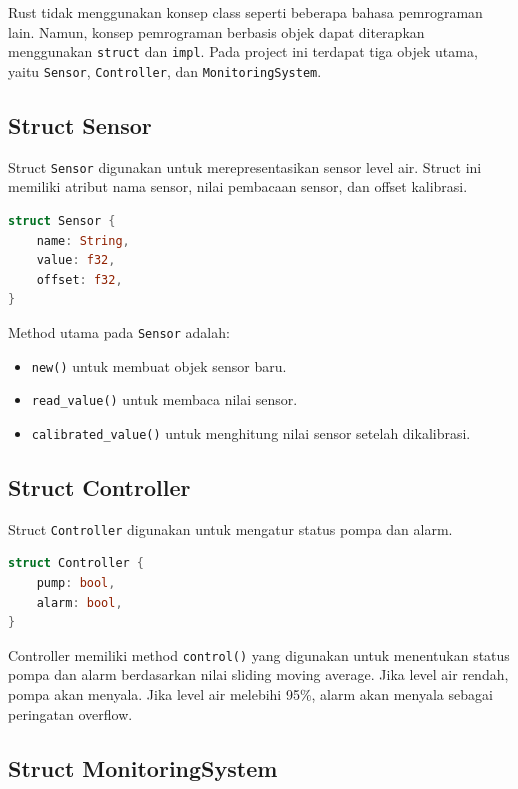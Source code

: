 \documentclass[12pt,a4paper]{article}
\begin{document}
Rust tidak menggunakan konsep class seperti beberapa bahasa pemrograman lain. Namun, konsep pemrograman berbasis objek dapat diterapkan menggunakan \texttt{struct} dan \texttt{impl}. Pada project ini terdapat tiga objek utama, yaitu \texttt{Sensor}, \texttt{Controller}, dan \texttt{MonitoringSystem}.

\subsection{Struct Sensor}

Struct \texttt{Sensor} digunakan untuk merepresentasikan sensor level air. Struct ini memiliki atribut nama sensor, nilai pembacaan sensor, dan offset kalibrasi.

\begin{lstlisting}[language=Rust]
struct Sensor {
    name: String,
    value: f32,
    offset: f32,
}
\end{lstlisting}

Method utama pada \texttt{Sensor} adalah:

\begin{itemize}
    \item \texttt{new()} untuk membuat objek sensor baru.
    \item \texttt{read\_value()} untuk membaca nilai sensor.
    \item \texttt{calibrated\_value()} untuk menghitung nilai sensor setelah dikalibrasi.
\end{itemize}

\subsection{Struct Controller}

Struct \texttt{Controller} digunakan untuk mengatur status pompa dan alarm.

\begin{lstlisting}[language=Rust]
struct Controller {
    pump: bool,
    alarm: bool,
}
\end{lstlisting}

Controller memiliki method \texttt{control()} yang digunakan untuk menentukan status pompa dan alarm berdasarkan nilai sliding moving average. Jika level air rendah, pompa akan menyala. Jika level air melebihi 95\%, alarm akan menyala sebagai peringatan overflow.

\subsection{Struct MonitoringSystem}
\end{document}
